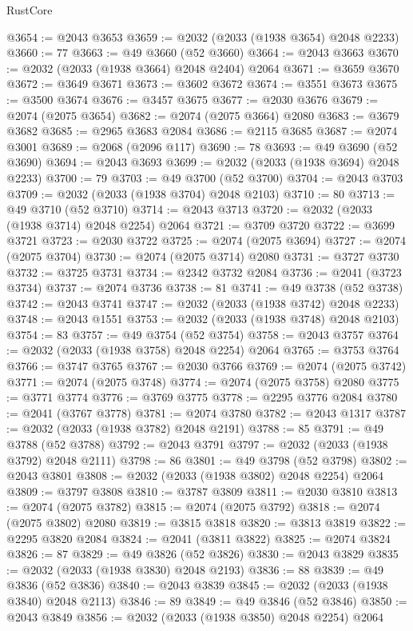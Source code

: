 \begin{lexlean}{RustCore}
\begin{coremodule}
@3654 := @2043 @3653
@3659 := @2032 (@2033 (@1938 @3654) @2048 @2233)
@3660 := 77
@3663 := @49 @3660 (@52 @3660)
@3664 := @2043 @3663
@3670 := @2032 (@2033 (@1938 @3664) @2048 @2404) @2064
@3671 := @3659 @3670
@3672 := @3649 @3671
@3673 := @3602 @3672
@3674 := @3551 @3673
@3675 := @3500 @3674
@3676 := @3457 @3675
@3677 := @2030 @3676
@3679 := @2074 (@2075 @3654)
@3682 := @2074 (@2075 @3664) @2080
@3683 := @3679 @3682
@3685 := @2965 @3683 @2084
@3686 := @2115 @3685
@3687 := @2074 @3001
@3689 := @2068 (@2096 @117)
@3690 := 78
@3693 := @49 @3690 (@52 @3690)
@3694 := @2043 @3693
@3699 := @2032 (@2033 (@1938 @3694) @2048 @2233)
@3700 := 79
@3703 := @49 @3700 (@52 @3700)
@3704 := @2043 @3703
@3709 := @2032 (@2033 (@1938 @3704) @2048 @2103)
@3710 := 80
@3713 := @49 @3710 (@52 @3710)
@3714 := @2043 @3713
@3720 := @2032 (@2033 (@1938 @3714) @2048 @2254) @2064
@3721 := @3709 @3720
@3722 := @3699 @3721
@3723 := @2030 @3722
@3725 := @2074 (@2075 @3694)
@3727 := @2074 (@2075 @3704)
@3730 := @2074 (@2075 @3714) @2080
@3731 := @3727 @3730
@3732 := @3725 @3731
@3734 := @2342 @3732 @2084
@3736 := @2041 (@3723 @3734)
@3737 := @2074 @3736
@3738 := 81
@3741 := @49 @3738 (@52 @3738)
@3742 := @2043 @3741
@3747 := @2032 (@2033 (@1938 @3742) @2048 @2233)
@3748 := @2043 @1551
@3753 := @2032 (@2033 (@1938 @3748) @2048 @2103)
@3754 := 83
@3757 := @49 @3754 (@52 @3754)
@3758 := @2043 @3757
@3764 := @2032 (@2033 (@1938 @3758) @2048 @2254) @2064
@3765 := @3753 @3764
@3766 := @3747 @3765
@3767 := @2030 @3766
@3769 := @2074 (@2075 @3742)
@3771 := @2074 (@2075 @3748)
@3774 := @2074 (@2075 @3758) @2080
@3775 := @3771 @3774
@3776 := @3769 @3775
@3778 := @2295 @3776 @2084
@3780 := @2041 (@3767 @3778)
@3781 := @2074 @3780
@3782 := @2043 @1317
@3787 := @2032 (@2033 (@1938 @3782) @2048 @2191)
@3788 := 85
@3791 := @49 @3788 (@52 @3788)
@3792 := @2043 @3791
@3797 := @2032 (@2033 (@1938 @3792) @2048 @2111)
@3798 := 86
@3801 := @49 @3798 (@52 @3798)
@3802 := @2043 @3801
@3808 := @2032 (@2033 (@1938 @3802) @2048 @2254) @2064
@3809 := @3797 @3808
@3810 := @3787 @3809
@3811 := @2030 @3810
@3813 := @2074 (@2075 @3782)
@3815 := @2074 (@2075 @3792)
@3818 := @2074 (@2075 @3802) @2080
@3819 := @3815 @3818
@3820 := @3813 @3819
@3822 := @2295 @3820 @2084
@3824 := @2041 (@3811 @3822)
@3825 := @2074 @3824
@3826 := 87
@3829 := @49 @3826 (@52 @3826)
@3830 := @2043 @3829
@3835 := @2032 (@2033 (@1938 @3830) @2048 @2193)
@3836 := 88
@3839 := @49 @3836 (@52 @3836)
@3840 := @2043 @3839
@3845 := @2032 (@2033 (@1938 @3840) @2048 @2113)
@3846 := 89
@3849 := @49 @3846 (@52 @3846)
@3850 := @2043 @3849
@3856 := @2032 (@2033 (@1938 @3850) @2048 @2254) @2064

\end{coremodule}
\end{lexlean}
